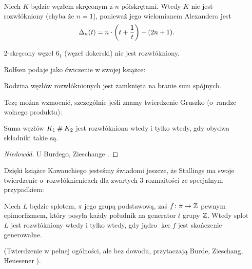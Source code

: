 \begin{example}
%
    Niech $K$ będzie węzłem skręconym z $n$ półskrętami.
    Wtedy $K$ nie jest rozwłókniony (chyba że $n = 1$), ponieważ jego wielomianem Alexandera jest
%
    \begin{equation}
        \Delta_n(t) = n \cdot \left(t + \frac 1 t \right) - (2n+1).
    \end{equation}
\end{example}

\begin{corollary}
    $2$-skręcony węzeł $6_1$ (węzeł dokerski) nie jest rozwłókniony.
\end{corollary}

Rolfsen \cite[s. 326]{rolfsen1976} podaje jako ćwiczenie w swojej książce:

\begin{proposition}
%
    Rodzina węzłów rozwłóknionych jest zamknięta na branie sum spójnych.
\end{proposition}

Tezę można wzmocnić, szczególnie jeśli znamy twierdzenie Gruszko (o~randze wolnego produktu):

\begin{proposition}
%
    Suma węzłów $K_1 \mathbin{\#} K_2$ jest rozwłókniona wtedy i tylko wtedy, gdy obydwa składniki takie są.
\end{proposition}

\begin{proof}[Niedowód]
    U Burdego, Zieschange \cite[s. 107]{burde2014}.
\end{proof}

Dzięki książce Kawauchiego \cite[s. 84]{kawauchi1996} jesteśmy świadomi jeszcze, że Stallings ma swoje twierdzenie o~rozwłóknienieach dla zwartych 3-rozmaitości ze specjalnym przypadkiem:
%
\begin{proposition}
    Niech $L$ będzie splotem, $\pi$ jego grupą podstawową, zaś $f \colon \pi \to \mathbb Z$ pewnym epimorfizmem, który posyła każdy południk na generator $t$ grupy $\mathbb Z$.
    Wtedy splot $L$ jest rozwłókniony wtedy i tylko wtedy, gdy jądro $\ker f$ jest skończenie generowalne.
\end{proposition}

(Twierdzenie w pełnej ogólności, ale bez dowodu, przytaczają Burde, Zieschang, Heuesener \cite[s. 75]{burde2014}).

%

